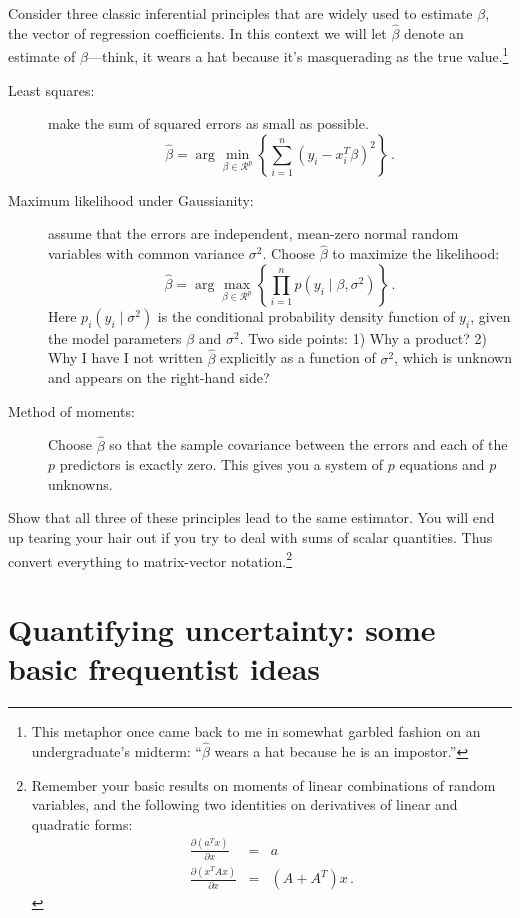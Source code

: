 \documentclass{mynotes}
\begin{document}
Consider three classic inferential principles that are widely used to estimate $\beta$, the vector of regression coefficients.  In this context we will let $\hat{\beta}$ denote an estimate of $\beta$---think, it wears a hat because it's masquerading as the true value.\footnote{This metaphor once came back to me in somewhat garbled fashion on an undergraduate's midterm: ``$\hat{\beta}$ wears a hat because he is an impostor.''}
\begin{description}
\item[Least squares:]make the sum of squared errors as small as possible.
$$
\hat{\beta} = \arg \min_{\beta \in \mathcal{R}^p} \left\{  \sum_{i=1}^n (y_i - x_i^T \beta)^2 \right\}  \, .
$$
\item[Maximum likelihood under Gaussianity:] assume that the errors are independent, mean-zero normal random variables with common variance $\sigma^2$.  Choose $\hat{\beta}$ to maximize the likelihood:
$$
\hat{\beta} = \arg \max_{\beta \in \mathcal{R}^p} \left\{ \prod_{i=1}^n p(y_i \mid \beta, \sigma^2) \right\} \, .
$$
Here $p_i(y_i \mid \sigma^2)$ is the conditional probability density function of $y_i$, given the model parameters $\beta$ and $\sigma^2$.  Two side points: 1) Why a product? 2) Why I have I not written $\hat{\beta}$ explicitly as a function of $\sigma^2$, which is unknown and appears on the right-hand side?

\item[Method of moments:] Choose $\hat{\beta}$ so that the sample covariance between the errors and each of the $p$ predictors is exactly zero.  This gives you a system of $p$ equations and $p$ unknowns.
\end{description}

Show that all three of these principles lead to the same estimator.  You will end up tearing your hair out if you try to deal with sums of scalar quantities.  Thus convert everything to matrix-vector notation.\footnote{Remember your basic results on moments of linear combinations of random variables, and the following two identities on derivatives of linear and quadratic forms:
\begin{eqnarray*}
\frac{\partial (a^Tx)}{\partial x} &=& a \\
\frac{\partial (x^T A x)}{\partial x} &=& (A + A^T) x \, .
\end{eqnarray*}
}

\newpage

\section{Quantifying uncertainty: some basic frequentist ideas}
\end{document}
